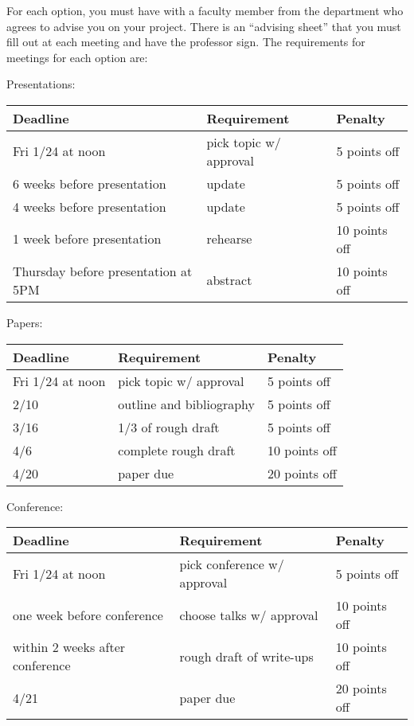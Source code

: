 \documentclass[11pt]{article}
\begin{document}
\flushleft

For each option, you must have with a faculty member from the department who agrees to advise you on your project. There is an ``advising sheet'' that you must fill out at each meeting and have the professor sign. The requirements for meetings for each option are:

\flushleft
Presentations:\\
\begin{tabular}{@{}|l|l|l|}
\hline
Deadline & Requirement & Penalty\\\hline
Fri 1/24 at noon & pick topic w/ approval & 5 points off\\\hline
6 weeks before presentation & update & 5 points off\\\hline
4 weeks before presentation & update & 5 points off\\\hline
1 week before presentation & rehearse & 10 points off\\\hline
Thursday before presentation at 5PM & abstract & 10 points off\\\hline
\end{tabular}

\flushleft
Papers:\\
\begin{tabular}{@{}|l|l|l|}
\hline
Deadline & Requirement & Penalty\\\hline

Fri 1/24 at noon & pick topic w/ approval & 5 points off\\\hline
2/10 & outline and bibliography & 5 points off\\\hline
3/16  & 1/3 of rough draft & 5 points off\\\hline
4/6 & complete rough draft & 10 points off\\\hline
4/20 & paper due & 20 points off\\\hline
\end{tabular}

\flushleft
Conference:\\
\begin{tabular}{@{}|l|l|l|}
\hline
Deadline & Requirement & Penalty\\\hline
Fri 1/24 at noon & pick conference w/ approval & 5 points off\\\hline
one week before conference & choose talks w/ approval & 10 points off\\\hline
within 2 weeks after conference & rough draft of write-ups & 10 points off\\\hline
4/21 & paper due & 20 points off\\\hline
\end{tabular}
\end{document}
